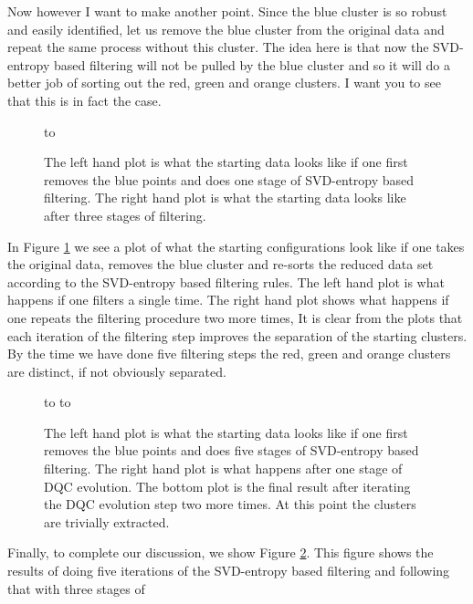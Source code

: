 \documentclass[fleqn,twoside]{article}
\begin{document}
Now however I want to make another point.  Since the blue cluster is
so robust and easily identified, let us remove the blue cluster from the
original data and repeat the same process without this cluster.  The
idea here is that now the SVD-entropy based filtering will not be
pulled by the blue cluster and so it will do a better job of sorting
out the red, green and orange clusters.  I want you to see that this is in
fact the case.
\begin{figure}[h]
   \hbox to 
  \caption{The left hand plot is what the starting data looks like
  if one first removes the blue points and does one stage of SVD-entropy
  based filtering.  The right hand plot is what the starting data looks
  like after three stages of filtering.
   }
\label{GolubFive}
\end{figure}
In Figure \ref{GolubFive} we see a plot of what the starting
configurations look like if one takes the original data, removes the
blue cluster and re-sorts the reduced data set according
to the SVD-entropy based filtering rules.  The left hand plot is
what happens if one filters a single time. The right hand plot
shows what happens if one repeats the filtering procedure two more times,
It is clear from the plots that each iteration of the
filtering step improves the separation of the
starting clusters.  By the time we have done five filtering steps the
red, green and orange clusters are distinct, if not obviously separated.
\begin{figure}
   \hbox to 
   \hbox to 
  \caption{The left hand plot is what the starting data looks like
  if one first removes the blue points and does five stages of SVD-entropy
  based filtering.  The right hand plot is what happens after one stage
  of DQC evolution.  The bottom plot is the final result after iterating
  the DQC evolution step two more times.  At this point the clusters
  are trivially extracted.
   }
\label{GolubSix}
\end{figure}
Finally, to complete our discussion, we show Figure \ref{GolubSix}.
This figure shows the results of doing five iterations of the
SVD-entropy based filtering and following that with three stages of
\end{document}
